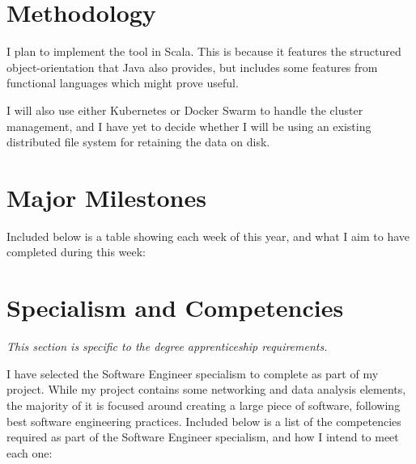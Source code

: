 \documentclass[12pt]{article}
\begin{document}
	\section{Methodology}
	I plan to implement the tool in Scala. This is because it features the structured object-orientation that Java also provides, but includes some features from functional languages which might prove useful. 
	
	I will also use either Kubernetes or Docker Swarm to handle the cluster management, and I have yet to decide whether I will be using an existing distributed file system for retaining the data on disk.
	
	
	\section{Major Milestones}
	Included below is a table showing each week of this year, and what I aim to have completed during this week:
	
	
	\section{Specialism and Competencies}
	\small{\textit{This section is specific to the degree apprenticeship requirements.}} \medskip
	
	I have selected the Software Engineer specialism to complete as part of my project. While my project contains some networking and data analysis elements, the majority of it is focused around creating a large piece of software, following best software engineering practices.
	Included below is a list of the competencies required as part of the Software Engineer specialism, and how I intend to meet each one:
	
	
\end{document}
